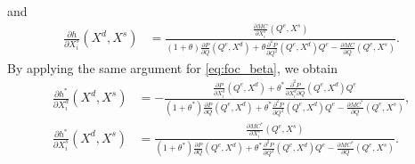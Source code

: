 \documentclass[11pt, a4paper]{article}
\theoremstyle{remark}
\begin{document}
and
\begin{align}
    \frac{\partial h}{\partial X^{s}_{i}}(X^{d}, X^{s}) & = \frac{\frac{\partial MC}{\partial X^{s}_{i}}(Q^e, X^{s})}{(1+\theta)\frac{\partial P}{\partial Q}(Q^e, X^{d}) + \theta\frac{\partial^2 P}{\partial Q^2}(Q^e, X^{d})Q^e - \frac{\partial MC}{\partial Q}(Q^e, X^{s})}. \label{eq:foc_derivative_supply}
\end{align}
By applying the same argument for \eqref{eq:foc_beta}, we obtain 
\begin{align}
    \frac{\partial h^{*}}{\partial X^{d}_{i}}(X^{d}, X^{s}) &= -\frac{\frac{\partial P}{\partial X^{d}_{i}}(Q^e, X^{d}) + \theta^{*}\frac{\partial^2 P}{\partial X^{d}_{i}\partial Q}(Q^e, X^{d})Q^e }{(1+\theta^{*})\frac{\partial P}{\partial Q}(Q^e, X^{d}) + \theta^{*}\frac{\partial^2 P}{\partial Q^2}(Q^e, X^{d})Q^e - \frac{\partial MC^{*}}{\partial Q}(Q^e, X^{s})},\label{eq:foc_derivative_demand_beta}\\
    \frac{\partial h^{*}}{\partial X^{s}_{i}}(X^{d}, X^{s}) & = \frac{\frac{\partial MC^{*}}{\partial X^{s}_{i}}(Q^e, X^{s})}{(1+\theta^{*})\frac{\partial P}{\partial Q}(Q^e, X^{d}) + \theta^{*}\frac{\partial^2 P}{\partial Q^2}(Q^e, X^{d})Q^e - \frac{\partial MC^{*}}{\partial Q}(Q^e, X^{s})}.\label{eq:foc_derivative_supply_beta}
\end{align}
\end{document}
